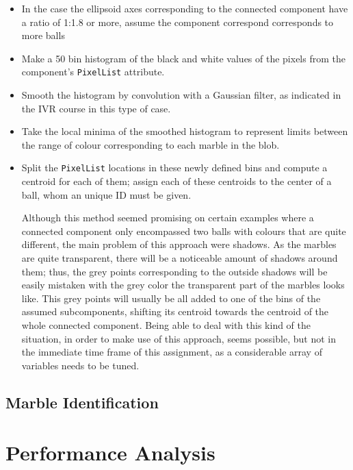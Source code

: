 \documentclass[10pt,a4paper,onecolumn]{report}
\begin{document}
\begin{itemize}
\item In the case the ellipsoid axes corresponding to the connected component have a ratio of 1:1.8 or more, assume the component correspond corresponds to more balls

\item Make a 50 bin histogram of the black and white values of the pixels from the component's \texttt{PixelList} attribute.

\item Smooth the histogram by convolution with a Gaussian filter, as indicated in the IVR course in this type of case.

\item Take the local minima of the smoothed histogram to represent limits between the range of colour corresponding to each marble in the blob.

\item Split the \texttt{PixelList} locations in these newly defined bins and compute a centroid for each of them; assign each of these centroids to the center of a ball, whom an unique ID must be given.

Although this method seemed promising on certain examples where a connected component only encompassed two balls with colours that are quite different, the main problem of this approach were shadows. As the marbles are quite transparent, there will be a noticeable amount of shadows around them; thus, the grey points corresponding to the outside shadows will be easily mistaken with the grey color the transparent part of the marbles looks like. This grey points will usually be all added to one of the bins of the assumed subcomponents, shifting its centroid towards the centroid of the whole connected component. Being able to deal with this kind of the situation, in order to make use of this approach, seems possible, but not in the immediate time frame of this assignment, as a considerable array of variables needs to be tuned.

\end{itemize}  

\subsection{Marble Identification}

\section{Performance Analysis}
\end{document}
